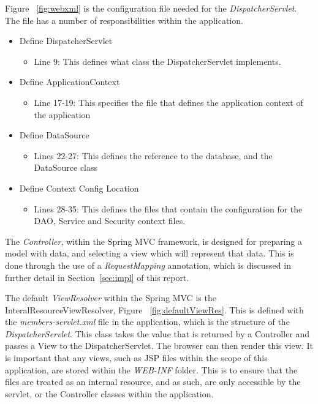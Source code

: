 Figure ~\ref{fig:webxml} is the configuration file needed for the \textit{DispatcherServlet}. The file has a number of responsibilities within the application.

\begin{table}[H]
\begin{itemize}
\item Define DispatcherServlet
\begin{itemize}
\item Line 9: This defines what class the DispatcherServlet implements.
\end{itemize}
\item Define ApplicationContext
\begin{itemize}
\item Line 17-19: This specifies the file that defines the application context of the application
\end{itemize}
\item Define DataSource
\begin{itemize}
\item Lines 22-27: This defines the reference to the database, and the DataSource class
\end{itemize}
\item Define Context Config Location
\begin{itemize}
\item Lines 28-35: This defines the files that contain the configuration for the DAO, Service and Security context files.
\end{itemize}
\end{itemize}
\label{fig:webxmlExplain}
\end{table}

The \textit{Controller}, within the Spring MVC framework, is designed for preparing a model with data, and selecting a view which will represent that data. This is done through the use of a \textit{RequestMapping} annotation, which is discussed in further detail in Section~\ref{sec:impl} of this report.

The default \textit{ViewResolver} within the Spring MVC is the InteralResourceViewResolver, Figure ~\ref{fig:defaultViewRes}. This is defined with the \textit{members-servlet.xml} file in the application, which is the structure of the \textit{DispatcherServlet}. This class takes the value that is returned by a Controller and passes a View to the DispatcherServlet. The browser can then render this view. It is important that any views, such as JSP files within the scope of this application, are stored within the \textit{WEB-INF} folder. This is to ensure that the files are treated as an internal resource, and as such, are only accessible by the servlet, or the Controller classes within the application.

